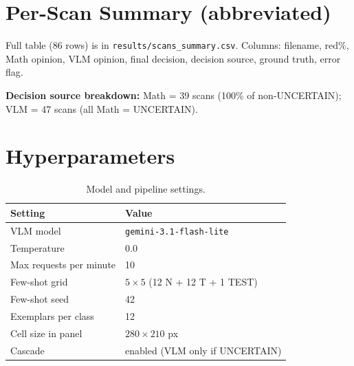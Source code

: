 \documentclass[11pt]{article}
\begin{document}
\section{Per-Scan Summary (abbreviated)}
\label{app:scans}

Full table (86 rows) is in \texttt{results/scans\_summary.csv}.
Columns: filename, red\%, Math opinion, VLM opinion, final decision, decision source, ground truth, error flag.

\textbf{Decision source breakdown:}
Math = 39 scans (100\% of non-UNCERTAIN);
VLM = 47 scans (all Math = UNCERTAIN).

\section{Hyperparameters}
\label{app:hparams}

\begin{table}[ht]
  \centering
  \caption{Model and pipeline settings.}
  \begin{tabular}{ll}
    \toprule
    Setting & Value \\
    \midrule
    VLM model & \texttt{gemini-3.1-flash-lite} \\
    Temperature & 0.0 \\
    Max requests per minute & 10 \\
    Few-shot grid & $5 \times 5$ (12 N + 12 T + 1 TEST) \\
    Few-shot seed & 42 \\
    Exemplars per class & 12 \\
    Cell size in panel & $280 \times 210$ px \\
    Cascade & enabled (VLM only if UNCERTAIN) \\
    \bottomrule
  \end{tabular}
\end{table}
\end{document}
